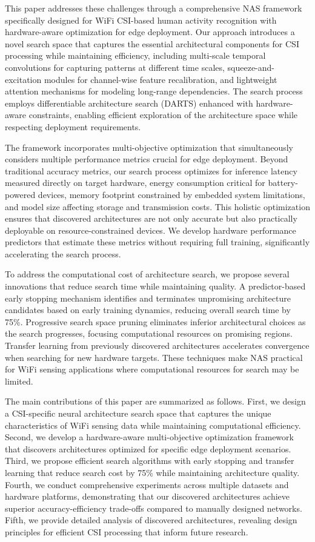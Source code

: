 \documentclass[journal]{IEEEtran}
\begin{document}
This paper addresses these challenges through a comprehensive NAS framework specifically designed for WiFi CSI-based human activity recognition with hardware-aware optimization for edge deployment. Our approach introduces a novel search space that captures the essential architectural components for CSI processing while maintaining efficiency, including multi-scale temporal convolutions for capturing patterns at different time scales, squeeze-and-excitation modules for channel-wise feature recalibration, and lightweight attention mechanisms for modeling long-range dependencies. The search process employs differentiable architecture search (DARTS) enhanced with hardware-aware constraints, enabling efficient exploration of the architecture space while respecting deployment requirements.

The framework incorporates multi-objective optimization that simultaneously considers multiple performance metrics crucial for edge deployment. Beyond traditional accuracy metrics, our search process optimizes for inference latency measured directly on target hardware, energy consumption critical for battery-powered devices, memory footprint constrained by embedded system limitations, and model size affecting storage and transmission costs. This holistic optimization ensures that discovered architectures are not only accurate but also practically deployable on resource-constrained devices. We develop hardware performance predictors that estimate these metrics without requiring full training, significantly accelerating the search process.

To address the computational cost of architecture search, we propose several innovations that reduce search time while maintaining quality. A predictor-based early stopping mechanism identifies and terminates unpromising architecture candidates based on early training dynamics, reducing overall search time by 75\%. Progressive search space pruning eliminates inferior architectural choices as the search progresses, focusing computational resources on promising regions. Transfer learning from previously discovered architectures accelerates convergence when searching for new hardware targets. These techniques make NAS practical for WiFi sensing applications where computational resources for search may be limited.

The main contributions of this paper are summarized as follows. First, we design a CSI-specific neural architecture search space that captures the unique characteristics of WiFi sensing data while maintaining computational efficiency. Second, we develop a hardware-aware multi-objective optimization framework that discovers architectures optimized for specific edge deployment scenarios. Third, we propose efficient search algorithms with early stopping and transfer learning that reduce search cost by 75\% while maintaining architecture quality. Fourth, we conduct comprehensive experiments across multiple datasets and hardware platforms, demonstrating that our discovered architectures achieve superior accuracy-efficiency trade-offs compared to manually designed networks. Fifth, we provide detailed analysis of discovered architectures, revealing design principles for efficient CSI processing that inform future research.
\end{document}
